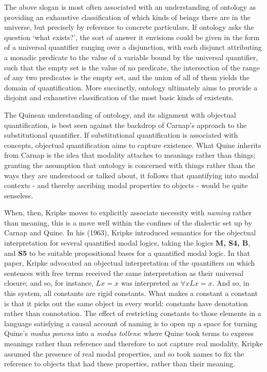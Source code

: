\documentclass[]{article}
\begin{document}
The above slogan is most often associated with an understanding of ontology as providing an exhaustive classification of which kinds of beings there are in the universe, but precisely by reference to concrete particulars. If ontology asks the question `what exists?', the sort of answer it envisions could be given in the form of a universal quantifier ranging over a disjunction, with each disjunct attributing a monadic predicate to the value of a variable bound by the universal quantifier, such that the empty set is the value of no predicate, the intersection of the range of any two predicates is the empty set, and the union of all of them yields the domain of quantification. More succinctly, ontology ultimately aims to provide a disjoint and exhaustive classification of the most basic kinds of existents. 

The Quinean understanding of ontology, and its alignment with objectual quantification, is best seen against the backdrop of Carnap's approach to the substitutional quantifier. If substitutional quantification is associated with concepts, objectual quantification aims to capture existence. What Quine inherits from Carnap is the idea that modality attaches to meanings rather than things; granting the assumption that ontology is concerned with things rather than the ways they are understood or talked about, it follows that quantifying into modal contexts - and thereby ascribing modal properties to objects - would be quite senseless.

When, then, Kripke moves to explicitly associate necessity with \textit{naming} rather than meaning, this is a move well within the confines of the dialectic set up by Carnap and Quine. In his (1963), Kripke introduced semantics for the objectual interpretation for several quantified modal logics, taking the logics \textbf{M, S4, B}, and \textbf{S5} to be suitable propositional bases for a quantified modal logic. In that paper, Kripke advocated an objectual interpretation of the quantifiers on which sentences with free terms received the same interpretation as their universal closure; and so, for instance, $Lx=x$ was interpreted as $\forall x Lx=x$. And so, in this system, all constants are rigid constants. What makes a constant a constant is that it picks out the same object in every world: constants have denotation rather than connotation. The effect of restricting constants to those elements in a language satisfying a causal account of naming is to open up a space for turning Quine's \textit{modus ponens} into a \textit{modus tollens}: where Quine took terms to express meanings rather than reference and therefore to not capture real modality, Kripke assumed the presence of real modal properties, and so took names to fix the reference to objects that had these properties, rather than their meaning. 
\end{document}
